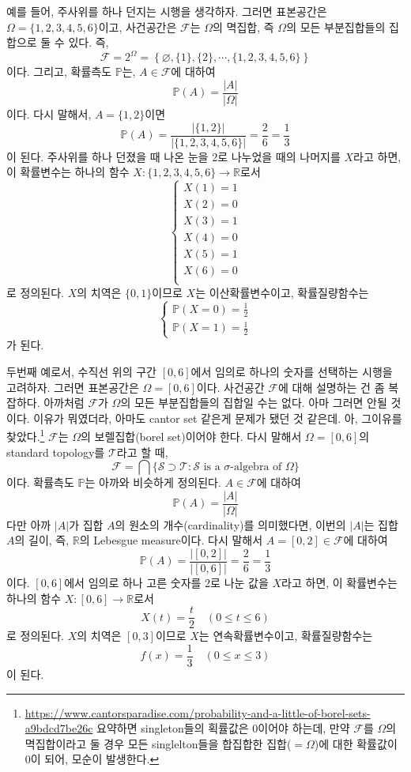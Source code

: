 \documentclass{article}
\begin{document}
예를 들어, 주사위를 하나 던지는 시행을 생각하자.
그러면 표본공간은 \(\Omega=\{1,2,3,4,5,6\}\)이고, 사건공간은 \(\mathcal F\)는 \(\Omega\)의 멱집합, 즉 \(\Omega\)의 모든 부분집합들의 집합으로 둘 수 있다.
즉,
\[\mathcal F=2^\Omega=\left\{\varnothing,\{1\},\{2\},\cdots,\{1,2,3,4,5,6\}\right\}\]
이다.
그리고, 확률측도 \(\mathbb P\)는, \(A\in\mathcal F\)에 대하여
\[\mathbb P(A)=\frac{|A|}{|\Omega|}\]
이다.
다시 말해서, \(A=\{1,2\}\)이면
\[\mathbb P(A)=\frac{|\{1,2\}|}{|\{1,2,3,4,5,6\}|}=\frac26=\frac13\]
이 된다.
주사위를 하나 던졌을 때 나온 눈을 2로 나누었을 때의 나머지를 \(X\)라고 하면, 이 확률변수는 하나의 함수 \(X:\{1,2,3,4,5,6\}\to\mathbb R\)로서
\[\begin{cases}
X(1)=1\\
X(2)=0\\
X(3)=1\\
X(4)=0\\
X(5)=1\\
X(6)=0\\
\end{cases}\]
로 정의된다.
\(X\)의 치역은 \(\{0,1\}\)이므로 \(X\)는 이산확률변수이고, 확률질량함수는
\[\begin{cases}
\mathbb P(X=0)=\frac12\\
\mathbb P(X=1)=\frac12
\end{cases}\]
가 된다.

두번째 예로서, 수직선 위의 구간 \([0,6]\)에서 임의로 하나의 숫자를 선택하는 시행을 고려하자.
그러면 표본공간은 \(\Omega=[0,6]\)이다.
사건공간 \(\mathcal F\)에 대해 설명하는 건 좀 복잡하다.
아까처럼 \(\mathcal F\)가 \(\Omega\)의 모든 부분집합들의 집합일 수는 없다.
아마 그러면 안될 것이다. 이유가 뭐였더라, 아마도 cantor set 같은게 문제가 됐던 것 같은데.
아, 그이유를 찾았다.\footnote{\url{https://www.cantorsparadise.com/probability-and-a-little-of-borel-sets-a9bdcd7be26c}
요약하면 singleton들의 획률값은 0이어야 하는데, 만약 \(\mathcal F\)를 \(\Omega\)의 멱집합이라고 둘 경우 모든 singlelton들을 합집합한 집합(\(=\Omega\))에 대한 확률값이 0이 되어, 모순이 발생한다.}
\(\mathcal F\)는 \(\Omega\)의 보렐집합(borel set)이어야 한다.
다시 말해서 \(\Omega=[0,6]\)의 standard topology를 \(\mathcal T\)라고 할 때,
\[\mathcal F=\bigcap\{\mathcal S\supset\mathcal T:\mathcal S\text{ is a \(\sigma\)-algebra of \(\Omega\)}\}\]
이다.
확률측도 \(\mathbb P\)는 아까와 비슷하게 정의된다.
\(A\in\mathcal F\)에 대하여
\[\mathbb P(A)=\frac{|A|}{|\Omega|}\]
다만 아까 \(|A|\)가  집합 \(A\)의 원소의 개수(cardinality)를 의미했다면, 이번의 \(|A|\)는 집합 \(A\)의 길이, 즉, \(\mathbb R\)의 Lebesgue measure이다.
다시 말해서 \(A=[0,2]\in\mathcal F\)에 대하여
\[\mathbb P(A)=\frac{|[0,2]|}{|[0,6]|}=\frac26=\frac13\]
이다.
\([0,6]\)에서 임의로 하나 고른 숫자를 2로 나눈 값을 \(X\)라고 하면, 이 확률변수는 하나의 함수 \(X:[0,6]\to\mathbb R\)로서
\[X(t)=\frac t2\quad(0\le t\le6)\]
로 정의된다.
\(X\)의 치역은 \([0,3]\)이므로 \(X\)는 연속확률변수이고, 확률질량함수는
\[f(x)=\frac13\quad(0\le x\le3)\]
이 된다.
\end{document}
